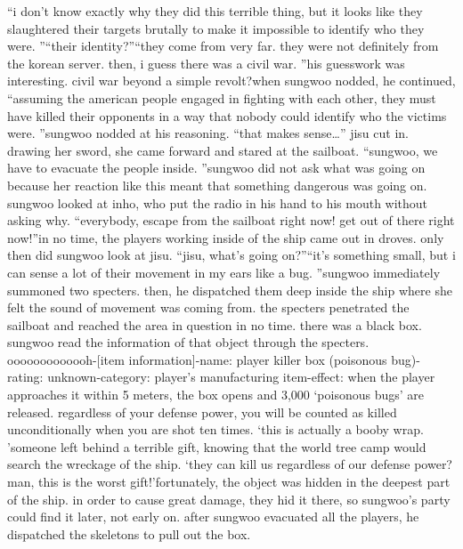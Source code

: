 “i don’t know exactly why they did this terrible thing, but it looks like they slaughtered their targets brutally to make it impossible to identify who they were.
”“their identity?”“they come from very far.
 they were not definitely from the korean server.
 then, i guess there was a civil war.
”his guesswork was interesting.
 civil war beyond a simple revolt?when sungwoo nodded, he continued, “assuming the american people engaged in fighting with each other, they must have killed their opponents in a way that nobody could identify who the victims were.
”sungwoo nodded at his reasoning.
“that makes sense…” jisu cut in.
drawing her sword, she came forward and stared at the sailboat.
“sungwoo, we have to evacuate the people inside.
”sungwoo did not ask what was going on because her reaction like this meant that something dangerous was going on.
sungwoo looked at inho, who put the radio in his hand to his mouth without asking why.
“everybody, escape from the sailboat right now! get out of there right now!”in no time, the players working inside of the ship came out in droves.
only then did sungwoo look at jisu.
“jisu, what’s going on?”“it’s something small, but i can sense a lot of their movement in my ears like a bug.
”sungwoo immediately summoned two specters.
 then, he dispatched them deep inside the ship where she felt the sound of movement was coming from.
the specters penetrated the sailboat and reached the area in question in no time.
there was a black box.
 sungwoo read the information of that object through the specters.
ooooooooooooh-[item information]-name: player killer box (poisonous bug)-rating: unknown-category: player’s manufacturing item-effect: when the player approaches it within 5 meters, the box opens and 3,000 ‘poisonous bugs’ are released.
 regardless of your defense power, you will be counted as killed unconditionally when you are shot ten times.
‘this is actually a booby wrap.
’someone left behind a terrible gift, knowing that the world tree camp would search the wreckage of the ship.
‘they can kill us regardless of our defense power? man, this is the worst gift!’fortunately, the object was hidden in the deepest part of the ship.
 in order to cause great damage, they hid it there, so sungwoo’s party could find it later, not early on.
after sungwoo evacuated all the players, he dispatched the skeletons to pull out the box.


